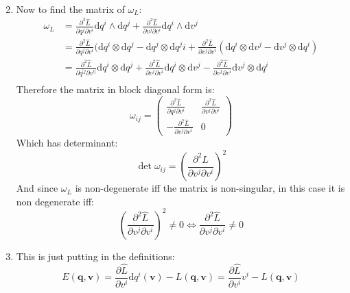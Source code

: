 \documentclass[12pt,a4]{article}
\newcommand{\e}{\mathrm{d}}
\begin{document}
\begin{enumerate}
\begin{align*}
    \end{align*}
  \item
    Now to find the matrix of $\omega_L$:
    \begin{align*}
      \omega_L
        &= \frac{\partial^2 \hat L}{\partial q^j \partial v^i} \e q^i \wedge \e q^j + \frac{\partial^2 \hat L}{\partial v^j \partial v^i} \e q^i \wedge \e v^j \\
        &= \frac{\partial^2 \hat L}{\partial q^j \partial v^i} (\e q^i \otimes \e q^j - \e q^j \otimes \e q^ji + \frac{\partial^2 \hat L}{\partial v^j \partial v^i} (\e q^i \otimes \e v^j - \e v^j \otimes \e q^i) \\
        &= \frac{\partial^2 \hat L}{\partial q^{[j} \partial v^{i]}} \e q^i \otimes \e q^j + \frac{\partial^2 \hat L}{\partial v^j \partial v^i} \e q^i \otimes \e v^j - \frac{\partial^2 \hat L}{\partial v^j \partial v^i}\e v^j \otimes \e q^i \\
    \end{align*}
    Therefore the matrix in block diagonal form is:
    \begin{equation*}
      \omega_{ij} = 
        \left(
          \begin{matrix}
            \frac{\partial^2 \hat L}{\partial q^j \partial v^i} & \frac{\partial^2 \hat L}{\partial v^j \partial v^i} \\
            - \frac{\partial^2 \hat L}{\partial v^j \partial v^i} & 0 
          \end{matrix}
        \right) 
    \end{equation*}
    Which has determinant:
    \begin{equation*}
      \det \omega_{ij} = 
            \left(\frac{\partial^2 \hat L}{\partial v^j \partial v^i} \right)^2
    \end{equation*}
    And since $\omega_L$ is non-degenerate iff the matrix is non-singular, in this case it is non degenerate iff:
    \begin{equation*}
      \left(\frac{\partial^2 \hat L}{\partial v^j \partial v^i} \right)^2 \neq 0 \Leftrightarrow \frac{\partial^2 \hat L}{\partial v^j \partial v^i}  \neq 0
    \end{equation*}
  \item
    This is just putting in the definitions:
    \begin{equation*}
      E(\mathbf{q}, \mathbf{v}) = \frac{\partial \hat L}{\partial v^i} \e q^i (\mathbf{v}) - L(\mathbf{q}, \mathbf{v}) = \frac{\partial \hat L}{\partial v^i} v^i - L(\mathbf{q}, \mathbf{v})

\end{equation*}
\end{enumerate}
\end{document}
